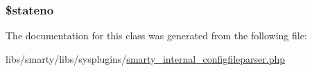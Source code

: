\subsubsection[{\$stateno}]{\setlength{\rightskip}{0pt plus 5cm}\$stateno}\label{class_t_p_c__yy_stack_entry_aebe2d8de0440725d5783d4447a8548d4}


The documentation for this class was generated from the following file\+:\begin{DoxyCompactItemize}
\item 
libs/smarty/libs/sysplugins/\hyperlink{smarty__internal__configfileparser_8php}{smarty\+\_\+internal\+\_\+configfileparser.\+php}\end{DoxyCompactItemize}
